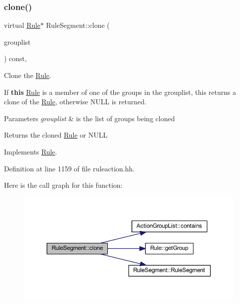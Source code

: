 \subsubsection{\texorpdfstring{clone()}{clone()}}
{\footnotesize\ttfamily virtual \mbox{\hyperlink{class_rule}{Rule}}$\ast$ Rule\+Segment\+::clone (\begin{DoxyParamCaption}\item[{const \mbox{\hyperlink{class_action_group_list}{Action\+Group\+List}} \&}]{grouplist }\end{DoxyParamCaption}) const\hspace{0.3cm}{\ttfamily [inline]}, {\ttfamily [virtual]}}



Clone the \mbox{\hyperlink{class_rule}{Rule}}. 

If {\bfseries{this}} \mbox{\hyperlink{class_rule}{Rule}} is a member of one of the groups in the grouplist, this returns a clone of the \mbox{\hyperlink{class_rule}{Rule}}, otherwise N\+U\+LL is returned. 
\begin{DoxyParams}{Parameters}
{\em grouplist} & is the list of groups being cloned \\
\hline
\end{DoxyParams}
\begin{DoxyReturn}{Returns}
the cloned \mbox{\hyperlink{class_rule}{Rule}} or N\+U\+LL 
\end{DoxyReturn}


Implements \mbox{\hyperlink{class_rule_a70de90a76461bfa7ea0b575ce3c11e4d}{Rule}}.



Definition at line 1159 of file ruleaction.\+hh.

Here is the call graph for this function\+:
\nopagebreak
\begin{figure}[H]
\begin{center}
\leavevmode
\includegraphics[width=350pt]{class_rule_segment_a12ddd2117c6a7ac26f4ae3b053abd363_cgraph}
\end{center}
\end{figure}
\mbox{\label{class_rule_segment_afc2e633c99b52bdfadad04b2749e3e26}} 

